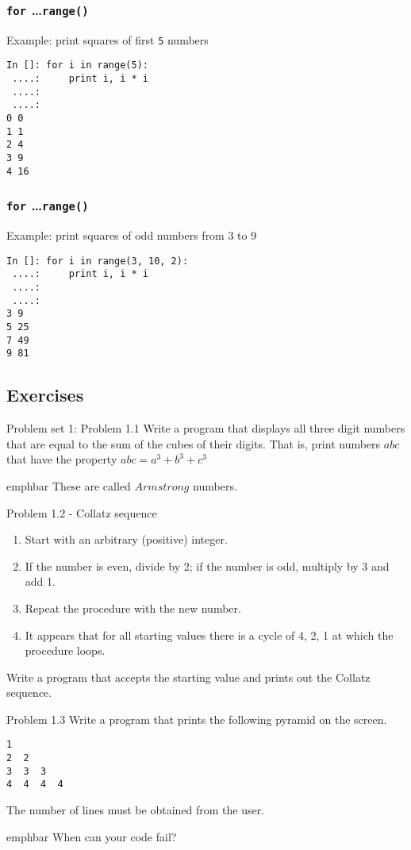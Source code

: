 \documentclass[14pt,compress]{beamer}
\newcommand{\emphbar}[1]
{\begin{beamercolorbox}[rounded=true]{emphbar} 
      {#1}
 \end{beamercolorbox}
}
\newcounter{time}
\newcommand{\inctime}[1]{\addtocounter{time}{#1}{\tiny \thetime\ m}}
\newcommand{\typ}[1]{\lstinline{#1}}
\begin{document}
\begin{frame}[fragile]
  \frametitle{\texttt{for} \ldots \typ{range()}}
Example: print squares of first \typ{5} numbers
  \begin{lstlisting}
In []: for i in range(5):
 ....:     print i, i * i
 ....:
 ....:
0 0
1 1
2 4
3 9
4 16
\end{lstlisting}
\end{frame}

\begin{frame}[fragile]
  \frametitle{\texttt{for} \ldots \typ{range()}}
Example: print squares of odd numbers from 3 to 9
  \begin{lstlisting}
In []: for i in range(3, 10, 2):
 ....:     print i, i * i
 ....:
 ....:
3 9
5 25
7 49
9 81
\end{lstlisting}
\inctime{5}
\end{frame}

\subsection{Exercises}

\begin{frame}{Problem set 1: Problem 1.1}
  Write a program that displays all three digit numbers that are equal to the sum of the cubes of their digits. That is, print numbers $abc$ that have the property $abc = a^3 + b^3 + c^3$\\
\vspace*{0.2in}
\emphbar{These are called $Armstrong$ numbers.}
\end{frame}

\begin{frame}{Problem 1.2 - Collatz sequence}
\begin{enumerate}
  \item Start with an arbitrary (positive) integer. 
  \item If the number is even, divide by 2; if the number is odd, multiply by 3 and add 1.
  \item Repeat the procedure with the new number.
  \item It appears that for all starting values there is a cycle of 4, 2, 1 at which the procedure loops.
\end{enumerate}
    Write a program that accepts the starting value and prints out the Collatz sequence.
\end{frame}

\begin{frame}[fragile]{Problem 1.3}
  Write a program that prints the following pyramid on the screen. 
  \begin{lstlisting}
1
2  2
3  3  3
4  4  4  4
  \end{lstlisting}
The number of lines must be obtained from the user.\\
\pause
\emphbar{When can your code fail?}
\inctime{5}
\end{frame}
\end{document}
